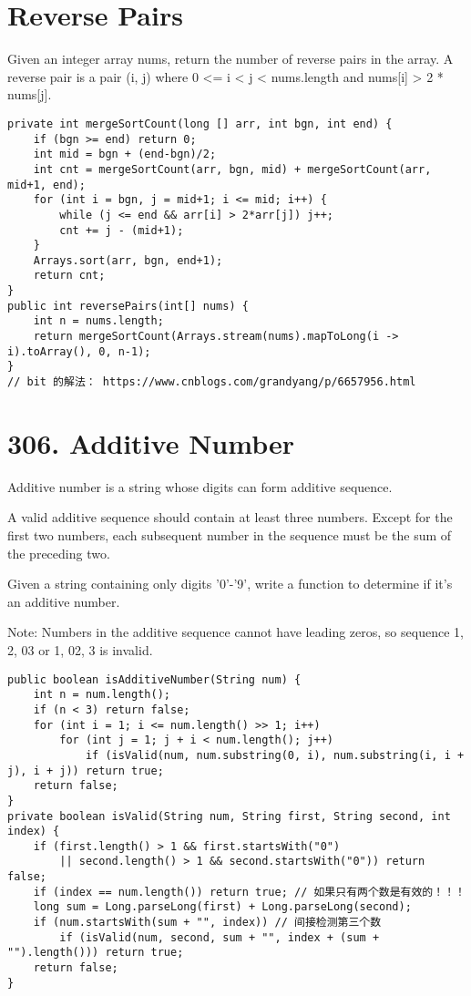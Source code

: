 \documentclass[9pt, b5paaper]{book}
\begin{document}
\section{Reverse Pairs}
\label{sec-3-1}
Given an integer array nums, return the number of reverse pairs in the array.
A reverse pair is a pair (i, j) where 0 <= i < j < nums.length and nums[i] > 2 * nums[j].
\begin{verbatim}
private int mergeSortCount(long [] arr, int bgn, int end) {
    if (bgn >= end) return 0;
    int mid = bgn + (end-bgn)/2;
    int cnt = mergeSortCount(arr, bgn, mid) + mergeSortCount(arr, mid+1, end);
    for (int i = bgn, j = mid+1; i <= mid; i++) {
        while (j <= end && arr[i] > 2*arr[j]) j++;
        cnt += j - (mid+1);
    }
    Arrays.sort(arr, bgn, end+1);
    return cnt;
}
public int reversePairs(int[] nums) {
    int n = nums.length;
    return mergeSortCount(Arrays.stream(nums).mapToLong(i -> i).toArray(), 0, n-1);
}
// bit 的解法： https://www.cnblogs.com/grandyang/p/6657956.html
\end{verbatim}

\section{306. Additive Number}
\label{sec-3-2}
Additive number is a string whose digits can form additive sequence.

A valid additive sequence should contain at least three numbers. Except for the first two numbers, each subsequent number in the sequence must be the sum of the preceding two.

Given a string containing only digits '0'-'9', write a function to determine if it's an additive number.

Note: Numbers in the additive sequence cannot have leading zeros, so sequence 1, 2, 03 or 1, 02, 3 is invalid.
\begin{verbatim}
public boolean isAdditiveNumber(String num) {
    int n = num.length();
    if (n < 3) return false;
    for (int i = 1; i <= num.length() >> 1; i++)
        for (int j = 1; j + i < num.length(); j++)  
            if (isValid(num, num.substring(0, i), num.substring(i, i + j), i + j)) return true;
    return false;
}
private boolean isValid(String num, String first, String second, int index) {
    if (first.length() > 1 && first.startsWith("0") 
        || second.length() > 1 && second.startsWith("0")) return false;
    if (index == num.length()) return true; // 如果只有两个数是有效的！！！
    long sum = Long.parseLong(first) + Long.parseLong(second);
    if (num.startsWith(sum + "", index)) // 间接检测第三个数
        if (isValid(num, second, sum + "", index + (sum + "").length())) return true;
    return false;
}
\end{verbatim}
\end{document}

